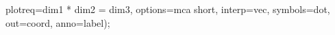 \begin{listing}
   plotreq=dim1 * dim2 = dim3,
   options=mca short, interp=vec, symbols=dot,
   out=coord, anno=label);
\end{listing}
